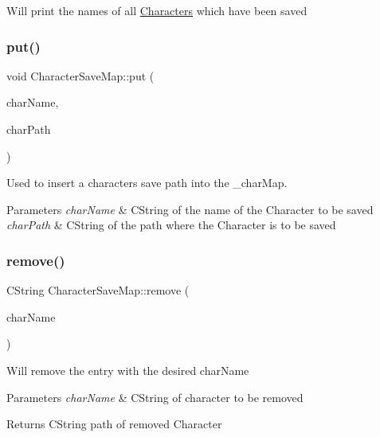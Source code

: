 Will print the names of all \hyperlink{class_characters}{Characters} which have been saved \hypertarget{class_character_save_map_a1b0d8a748f717733e02ca01d2492fc80}{}\label{class_character_save_map_a1b0d8a748f717733e02ca01d2492fc80} 
\subsubsection{\texorpdfstring{put()}{put()}}
{\footnotesize\ttfamily void Character\+Save\+Map\+::put (\begin{DoxyParamCaption}\item[{const C\+String \&}]{char\+Name,  }\item[{const C\+String \&}]{char\+Path }\end{DoxyParamCaption})}

Used to insert a character\textquotesingle{}s save path into the \+\_\+char\+Map. 
\begin{DoxyParams}{Parameters}
{\em char\+Name} & C\+String of the name of the Character to be saved \\
\hline
{\em char\+Path} & C\+String of the path where the Character is to be saved \\
\hline
\end{DoxyParams}
\hypertarget{class_character_save_map_a1daaac33e4d3550c29f6dd087d460209}{}\label{class_character_save_map_a1daaac33e4d3550c29f6dd087d460209} 
\subsubsection{\texorpdfstring{remove()}{remove()}}
{\footnotesize\ttfamily C\+String Character\+Save\+Map\+::remove (\begin{DoxyParamCaption}\item[{const C\+String \&}]{char\+Name }\end{DoxyParamCaption})}

Will remove the entry with the desired char\+Name 
\begin{DoxyParams}{Parameters}
{\em char\+Name} & C\+String of character to be removed \\
\hline
\end{DoxyParams}
\begin{DoxyReturn}{Returns}
C\+String path of removed Character 
\end{DoxyReturn}
\hypertarget{class_character_save_map_aa08505fbf7f84288fd9c21da0326bf49}{}\label{class_character_save_map_aa08505fbf7f84288fd9c21da0326bf49} 
